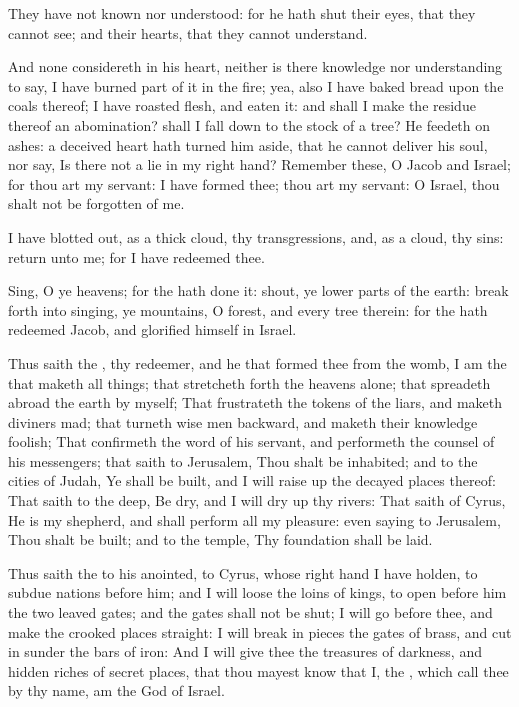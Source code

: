 \Verse They have not known nor understood: for he hath shut their eyes, that they cannot see; and their hearts, that they cannot understand.

\Verse And none considereth in his heart, neither is there knowledge nor understanding to say, I have burned part of it in the fire; yea, also I have baked bread upon the coals thereof; I have roasted flesh, and eaten it: and shall I make the residue thereof an abomination?  shall I fall down to the stock of a tree?  \Verse He feedeth on ashes: a deceived heart hath turned him aside, that he cannot deliver his soul, nor say, Is there not a lie in my right hand?  \Verse Remember these, O Jacob and Israel; for thou art my servant: I have formed thee; thou art my servant: O Israel, thou shalt not be forgotten of me.

\Verse I have blotted out, as a thick cloud, thy transgressions, and, as a cloud, thy sins: return unto me; for I have redeemed thee.

\Verse Sing, O ye heavens; for the \LORD hath done it: shout, ye lower parts of the earth: break forth into singing, ye mountains, O forest, and every tree therein: for the \LORD hath redeemed Jacob, and glorified himself in Israel.

\Verse Thus saith the \LORD, thy redeemer, and he that formed thee from the womb, I am the \LORD that maketh all things; that stretcheth forth the heavens alone; that spreadeth abroad the earth by myself; \Verse That frustrateth the tokens of the liars, and maketh diviners mad; that turneth wise men backward, and maketh their knowledge foolish; \Verse That confirmeth the word of his servant, and performeth the counsel of his messengers; that saith to Jerusalem, Thou shalt be inhabited; and to the cities of Judah, Ye shall be built, and I will raise up the decayed places thereof: \Verse That saith to the deep, Be dry, and I will dry up thy rivers: \Verse That saith of Cyrus, He is my shepherd, and shall perform all my pleasure: even saying to Jerusalem, Thou shalt be built; and to the temple, Thy foundation shall be laid.


\Chapter
\Verse Thus saith the \LORD to his anointed, to Cyrus, whose right hand I have holden, to subdue nations before him; and I will loose the loins of kings, to open before him the two leaved gates; and the gates shall not be shut; \Verse I will go before thee, and make the crooked places straight: I will break in pieces the gates of brass, and cut in sunder the bars of iron: \Verse And I will give thee the treasures of darkness, and hidden riches of secret places, that thou mayest know that I, the \LORD, which call thee by thy name, am the God of Israel.

